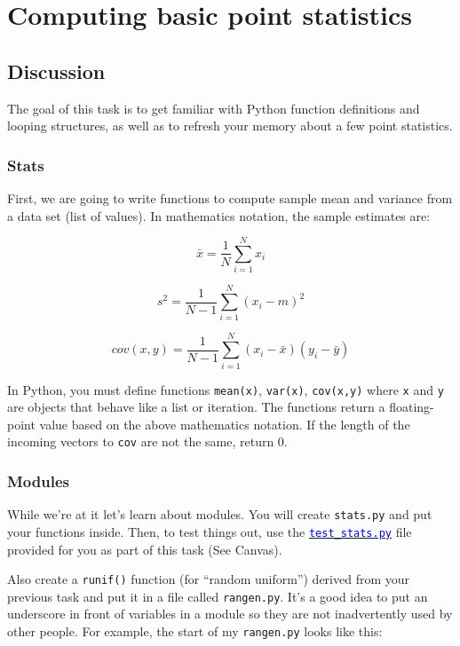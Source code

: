 \chapter{Computing basic point statistics}

\setcounter{problem}{1}
\section{Discussion}

\begin{fullwidth}

The goal of this task is to get familiar with Python function definitions and looping structures, as well as to refresh your memory about a few point statistics. 

\subsection{Stats}

First, we are going to write functions to compute sample mean and variance from a data set (list of values).  In mathematics notation, the sample estimates are:

\[\tag{Sample mean}
\bar x = \frac{1}{N} \sum_{i=1}^{N} x_i 
\]

\[\tag{Unbiased sample variance}
s^2 = \frac{1}{N-1} \sum_{i=1}^{N} (x_i - m)^2
\]

\[\tag{Unbiased sample covariance}
cov(x,y) = \frac{1}{N-1} \sum_{i=1}^{N} (x_i - \bar x)(y_i - \bar y)
\]

In Python, you must define functions {\tt mean(x)}, {\tt var(x)}, {\tt cov(x,y)} where {\tt x} and {\tt y} are objects that behave like a list or iteration. The functions return a floating-point value based on the above mathematics notation. If the length of the incoming vectors to {\tt cov} are not the same, return 0.

\subsection{Modules}

While we're at it let's learn about modules. You will create {\tt stats.py} and put your functions inside. Then, to test things out, use the \href{https://usfca.instructure.com/courses/1053753/assignments/3459436}{\textcolor{blue}{\tt test\_stats.py}} file provided for you as part of this task (See Canvas).

Also create a {\tt runif()} function (for ``random uniform'') derived from your previous task and put it in a file called {\tt rangen.py}.   It's a good idea to put an underscore in front of variables in a module so they are not inadvertently used by other people. For example, the start of my {\tt rangen.py} looks like this:


\end{fullwidth}
